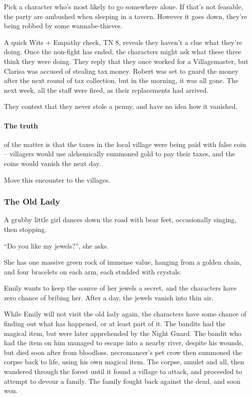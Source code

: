 Pick a character who's most likely to go somewhere alone.  If that's not feasable, the party are ambushed when sleeping in a tavern.  However it goes down, they're being robbed by some wannabe-thieves.

\humanmaid

\humanthief

A quick Wits + Empathy check, TN 8, reveals they haven't a clue what they're doing.  Once the non-fight has ended, the characters might ask what these three think they were doing.  They reply that they once worked for a Villagemaster, but Clarisa was accused of stealing tax money.  Robert was set to guard the money after the next round of tax collection, but in the morning, it was all gone.  The next week, all the staff were fired, as their replacements had arrived.

They contest that they never stole a penny, and have no idea how it vanished.

\paragraph{The truth} of the matter is that the taxes in the local village were being paid with false coin -- villagers would use alchemically summoned gold to pay their taxes, and the coins would vanish the next day.

Move this encounter to the villages.

\subsubsection{The Old Lady}

\begin{boxtext}
	A grubby little girl dances down the road with bear feet, occasionally singing, then stopping.

		``Do you like my jewels?'', she asks.

	She has one massive green rock of immense value, hanging from a golden chain, and four bracelets on each arm, each studded with crystals.
\end{boxtext}

Emily wants to keep the source of her jewels a secret, and the characters have zero chance of bribing her.  After a day, the jewels vanish into thin air.

While Emily will not visit the old lady again, the characters have some chance of finding out what has happened, or at least part of it.  The bandits had the magical item, but were later apprehended by the Night Guard.  The bandit who had the item on him managed to escape into a nearby river, despite his wounds, but died soon after from bloodloss.  \Gls{necromancer}'s pet crow then summoned the corpse back to life, using his own magical item.  The corpse, amulet and all, then wandered through the forest until it found a village to attack, and proceeded to attempt to devour a family.  The family fought back against the dead, and soon won.

